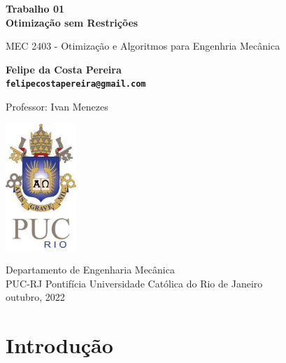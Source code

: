 \documentclass[10pt, a4paper]{article}
\begin{document}
\begin{titlepage}
      \begin{center}
          \vspace*{1cm}

          \Huge
          \textbf{Trabalho 01 \\ Otimiza\c c\~ao  sem Restri\c c\~oes}

          \vspace{0.5cm}
          \LARGE
          MEC 2403 - Otimiza\c c\~ao e Algoritmos para Engenhria Mec\^anica

          \vspace{1.5cm}

          \textbf{Felipe da Costa Pereira \\ {\tt felipecostapereira@gmail.com}}

          \vfill
          Professor: Ivan Menezes

          \vspace{0.8cm}

          \includegraphics[width=0.2\textwidth]{puc.jpg}

          \Large
          Departamento de Engenharia Mec\^anica\\
          PUC-RJ Pontif\'icia Universidade Cat\'olica do Rio de Janeiro\\
          outubro, 2022

      \end{center}
  \end{titlepage}





\section{Introdu\c c\~ao}
\end{document}

